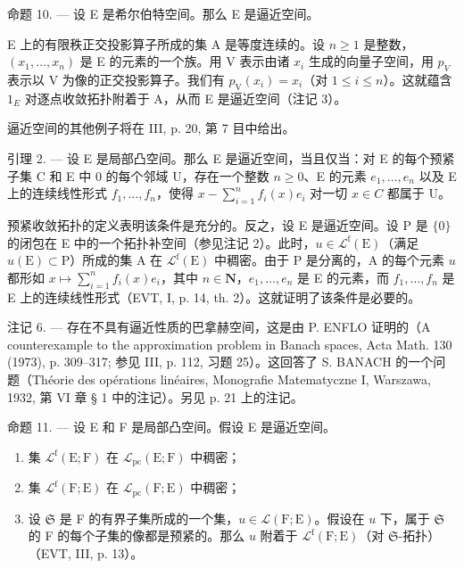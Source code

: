命题 10. --- 设 E 是希尔伯特空间。那么 E 是逼近空间。

E 上的有限秩正交投影算子所成的集 A 是等度连续的。设 \(n \geqslant 1\) 是整数，\((x_{1}, \ldots, x_{n})\) 是 E 的元素的一个族。用 V 表示由诸 \(x_{i}\) 生成的向量子空间，用 \(p_{V}\) 表示以 V 为像的正交投影算子。我们有 \(p_{\mathrm{V}}(x_{i}) = x_{i}\)（对 \(1 \leqslant i \leqslant n\)）。这就蕴含 \(1_{E}\) 对逐点收敛拓扑附着于 A，从而 E 是逼近空间（注记 3）。

逼近空间的其他例子将在 III, p. 20, 第 7 目中给出。

引理 2. --- 设 E 是局部凸空间。那么 E 是逼近空间，当且仅当：对 E 的每个预紧子集 C 和 E 中 0 的每个邻域 U，存在一个整数 \(n \geqslant 0\)、E 的元素 \(e_{1}, \ldots, e_{n}\) 以及 E 上的连续线性形式 \(f_{1}, \ldots, f_{n}\)，使得 \(x - \sum_{i=1}^{n} f_{i}(x)e_{i}\) 对一切 \(x \in C\) 都属于 U。

预紧收敛拓扑的定义表明该条件是充分的。反之，设 E 是逼近空间。设 P 是 \(\{0\}\) 的闭包在 E 中的一个拓扑补空间（参见注记 2）。此时，\(u \in \mathcal{L}^{\mathrm{f}}(\mathrm{E})\)（满足 \(u(\mathrm{E}) \subset \mathrm{P}\)）所成的集 A 在 \(\mathcal{L}^{\mathrm{f}}(\mathrm{E})\) 中稠密。由于 P 是分离的，A 的每个元素 \(u\) 都形如 \(x \mapsto \sum_{i=1}^{n} f_i(x)e_i\)，其中 \(n \in \mathbf{N}\)，\(e_1, \ldots, e_n\) 是 E 的元素，而 \(f_1, \ldots, f_n\) 是 E 上的连续线性形式（EVT, I, p. 14, th. 2）。这就证明了该条件是必要的。

注记 6. --- 存在不具有逼近性质的巴拿赫空间，这是由 P. ENFLO 证明的（A counterexample to the approximation problem in Banach spaces, Acta Math. 130 (1973), p. 309--317; 参见 III, p. 112, 习题 25）。这回答了 S. BANACH 的一个问题（Théorie des opérations linéaires, Monografie Matematyczne I, Warszawa, 1932, 第 VI 章 § 1 中的注记）。另见 p. 21 上的注记。

命题 11. --- 设 E 和 F 是局部凸空间。假设 E 是逼近空间。

\begin{enumerate}
\def\labelenumi{\alph{enumi})}
\item
  集 \(\mathcal{L}^{\mathrm{f}}(\mathrm{E};\mathrm{F})\) 在 \(\mathcal{L}_{\mathrm{pc}}(\mathrm{E};\mathrm{F})\) 中稠密；
\item
  集 \(\mathcal{L}^{\mathrm{f}}(\mathrm{F};\mathrm{E})\) 在 \(\mathcal{L}_{\mathrm{pc}}(\mathrm{F};\mathrm{E})\) 中稠密；
\item
  设 \(\mathfrak{S}\) 是 F 的有界子集所成的一个集，\(u \in \mathcal{L}(\mathrm{F};\mathrm{E})\)。假设在 \(u\) 下，属于 \(\mathfrak{S}\) 的 F 的每个子集的像都是预紧的。那么 \(u\) 附着于 \(\mathcal{L}^{\mathrm{f}}(\mathrm{F};\mathrm{E})\)（对 \(\mathfrak{S}\)-拓扑）（EVT, III, p. 13）。
\end{enumerate}

